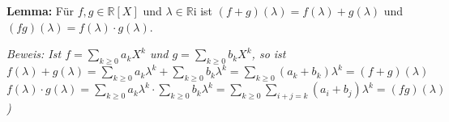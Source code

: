 \documentclass[11pt]{article}
\begin{document}
		\begin{framed}
			\textbf{Lemma:} F\"ur $f,g \in \mathbb R[X]$ und $\lambda \in \mathbb R$i ist $(f+g)(\lambda)=f(\lambda)+
			g(\lambda)$ und $(fg)(\lambda)=f(\lambda) \cdot g(\lambda)$.
		\end{framed}
		\textit{Beweis: Ist $f=\sum \limits_{k \ge 0} a_kX^k$ und $g=\sum \limits_{k\ge 0} b_kX^k$, so ist \\
		$f(\lambda)+g(\lambda)=\sum \limits_{k \ge 0} a_k\lambda^k + \sum \limits_{k\ge 0} b_k\lambda^k = \sum 
		\limits_{k\ge 0} (a_k+b_k)\lambda^k=(f+g)(\lambda)$ \\
		$f(\lambda)\cdot g(\lambda)= \sum \limits_{k\ge 0} a_k\lambda^k \cdot \sum \limits_{k\ge 0} b_k\lambda^k = 
		\sum \limits_{k \ge 0} \sum \limits_{i+j=k} (a_i+b_j)\lambda^k = (fg)(\lambda)$)}
\end{document}
